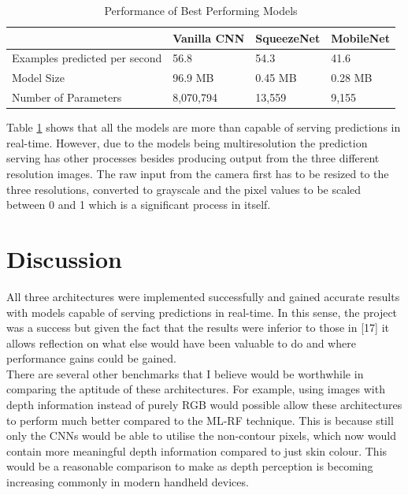 \documentclass{article}
\begin{document}
\begin{table}[h!]
  \begin{center}
    \caption{Performance of Best Performing Models}
    \label{tab:speed}
    \begin{tabular}{l|l|l|l}
      \textbf{} & \textbf{Vanilla CNN} &  \textbf{SqueezeNet} & \textbf{MobileNet}  \\
      \hline
      Examples predicted per second & 56.8 & 54.3 & 41.6 \\
      Model Size & 96.9 MB  & 0.45 MB & 0.28 MB \\
      Number of Parameters & 8,070,794 & 13,559 & 9,155\\
    \end{tabular}
  \end{center}
\end{table}

Table \ref{tab:speed} shows that all the models are more than capable of serving predictions in real-time. However, due to the models being multiresolution the prediction serving has other processes besides producing output from the three different resolution images. The raw input from the camera first has to be resized to the three resolutions, converted to grayscale and the pixel values to be scaled between 0 and 1 which is a significant process in itself.


\section{Discussion}
All three architectures were implemented successfully and gained accurate results with models capable of serving predictions in real-time. In this sense, the project was a success but given the fact that the results were inferior to those in [17] it allows reflection on what else would have been valuable to do and where performance gains could be gained. \\

There are several other benchmarks that I believe would be worthwhile in comparing the aptitude of these architectures. For example, using images with depth information instead of purely RGB would possible allow these architectures to perform much better compared to the ML-RF technique. This is because still only the CNNs would be able to utilise the non-contour pixels, which now would contain more meaningful depth information compared to just skin colour. This would be a reasonable comparison to make as depth perception is becoming increasing commonly in modern handheld devices. \\
\end{document}
